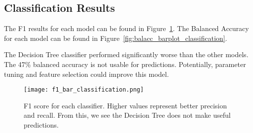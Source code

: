 
\subsection{Classification Results}
\setlength{\parindent}{10ex}
The F1 results for each model can be found in Figure~\ref{fig:f1_barplot_classification}.
The Balanced Accuracy for each model can be found in Figure~\ref{fig:balacc_barplot_classification}.

\par
The Decision Tree classifier performed significantly worse than the other models.
The 47\% balanced accuracy is not usable for predictions.
Potentially, parameter tuning and feature selection could improve this model.


\begin{figure}[htp]
    \centering
    \texttt{[image: f1\_bar\_classification.png]}
    \caption[Graph depicting the F1 score for each classifier]{F1 score for each classifier. Higher values represent better precision and recall. From this, we see the Decision Tree does not make useful predictions.}
    \label{fig:f1_barplot_classification}
\end{figure}

